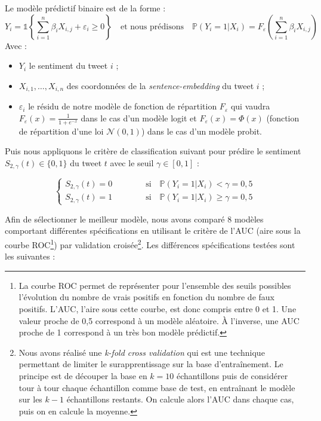 \documentclass[11pt,french,french]{article}
\let\rmarkdownfootnote\footnote%
\def\footnote{\protect\rmarkdownfootnote}
\begin{document}
Le modèle prédictif binaire est de la forme :
\[Y_i = \mathds{1}\left\{ \sum_{i = 1}^n \beta_i X_{i,j} + \varepsilon_i \geq 0 \right\} 
\quad \text{et nous prédisons} \quad  \mathbb{P}(Y_i = 1 | X_{i}) = F_{\varepsilon}\left(\sum_{i = 1}^n \beta_i X_{i,j}\right)\]
Avec :

\begin{itemize}
\item $Y_i$ le sentiment du tweet $i$ ;
\item $X_{i,1}, \dots, X_{i,n}$ des coordonnées de la \emph{sentence-embedding} du tweet $i$ ;
\item $\varepsilon_i$ le résidu de notre modèle de fonction de répartition $F_{\varepsilon}$ qui vaudra $F_{\varepsilon}(x) = \frac{1}{1 + e^{-x}}$ dans le cas d'un modèle logit et $F_{\varepsilon}(x) = \Phi(x)$ (fonction de répartition d'une loi $\mathcal{N}(0, 1)$) dans le cas d'un modèle probit. 
\end{itemize}

Puis nous appliquons le critère de classification suivant pour prédire le sentiment \(S_{2,\gamma}(t) \in \{0,1\}\) du tweet \(t\) avec le seuil \(\gamma \in [0,1]\) :

\[\begin{cases}
S_{2,\gamma}(t) = 0 \qquad \qquad \text{si} \quad \mathbb{P}(Y_i = 1 | X_{i}) < \gamma = 0,5 \\
S_{2,\gamma}(t) = 1 \qquad \qquad \text{si} \quad \mathbb{P}(Y_i = 1 | X_{i}) \ge \gamma = 0,5
\end{cases}
\]

Afin de sélectionner le meilleur modèle, nous avons comparé 8 modèles comportant différentes spécifications en utilisant le critère de l'AUC (aire sous la courbe ROC\footnote{La courbe ROC permet de représenter pour l'ensemble des seuils possibles l'évolution du nombre de vrais positifs en fonction du nombre de faux positifs.
  L'AUC, l'aire sous cette courbe, est donc compris entre 0 et 1. Une valeur proche de 0,5 correspond à un modèle aléatoire. À l'inverse, une AUC proche de 1 correspond à un très bon modèle prédictif.}) par validation croisée\footnote{Nous avons réalisé une \emph{k-fold cross validation} qui est une technique permettant de limiter le surapprentissage sur la base d'entraînement. Le principe est de découper la base en \(k = 10\) échantillons puis de considérer tour à tour chaque échantillon comme base de test, en entraînant le modèle sur les \(k-1\) échantillons restants. On calcule alors l'AUC dans chaque cas, puis on en calcule la moyenne. }. Les différences spécifications testées sont les suivantes :
\end{document}
